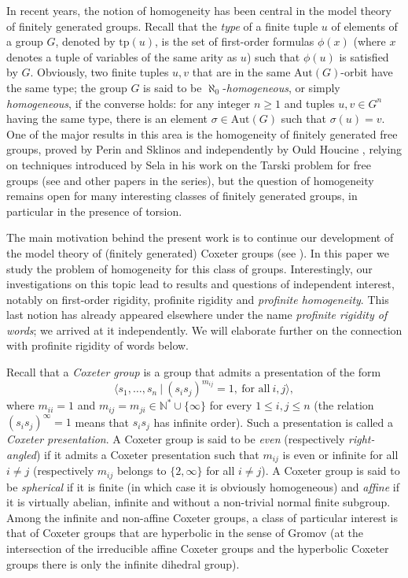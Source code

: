 \documentclass[a4paper, 11pt]{amsart}
\theoremstyle{definition}
\theoremstyle{remark}
\renewcommand{\leq}{\leqslant}
\renewcommand{\geq}{\geqslant}
\begin{document}
In recent years, the notion of homogeneity has been central in the model theory of finitely generated groups. Recall that the \emph{type} of a finite tuple $u$ of elements of a group $G$, denoted by $\mathrm{tp}(u)$, is the set of first-order formulas $\phi(x)$ (where $x$ denotes a tuple of variables of the same arity as $u$) such that $\phi(u)$ is satisfied by $G$. Obviously, two finite tuples $u,v$ that are in the same $\mathrm{Aut}(G)$-orbit have the same type; the group $G$ is said to be $\aleph_0$-\emph{homogeneous}, or simply \emph{homogeneous}, if the converse holds: for any integer $n\geq 1$ and tuples $u,v\in G^n$ having the same type, there is an element $\sigma\in \mathrm{Aut}(G)$ such that $\sigma(u)=v$. One of the major results in this area is the homogeneity of finitely generated free groups, proved by Perin and Sklinos \cite{PS12} and independently by Ould Houcine \cite{OH11}, relying on techniques introduced by Sela in his work on the Tarski problem for free groups (see \cite{Sel06} and other papers in the series), but the question of homogeneity remains open for many interesting classes of finitely generated groups, in particular in the presence of torsion.

\smallskip

The main motivation behind the present work is to continue our development of the model theory of (finitely generated) Coxeter groups (see \cite{MUHLHERR2022297,PS23,AP24}). In this paper we study the problem of homogeneity for this class of groups. Interestingly, our investigations on this topic lead to results and questions of independent interest, notably on first-order rigidity, profinite rigidity and {\em profinite homogeneity}. This last notion has already appeared elsewhere under the name {\em profinite rigidity of words}; we arrived at it independently. We will elaborate further on the connection with profinite rigidity of words below.

\smallskip

Recall that a \emph{Coxeter group} is a group that admits a presentation of the form \[\langle s_1,\ldots,s_n \ \vert \ (s_is_j)^{m_{ij}}=1, \ \text{for all} \ i,j \rangle,\] where $m_{ii}=1$ and $m_{ij} = m_{ji} \in \mathbb{N}^{\ast}\cup \lbrace \infty\rbrace$ for every $1\leq i,j\leq n$ (the relation $(s_is_j)^{\infty}=1$ means that $s_is_j$ has infinite order). Such a presentation is called a \emph{Coxeter presentation}. A Coxeter group is said to be \emph{even} (respectively \emph{right-angled}) if it admits a Coxeter presentation such that $m_{ij}$ is even or infinite for all $i\neq j$ (respectively $m_{ij}$ belongs to $\lbrace 2,\infty\rbrace$ for all $i\neq j$). A Coxeter group is said to be \emph{spherical} if it is finite (in which case it is obviously homogeneous) and \emph{affine} if it is virtually abelian, infinite and without a non-trivial normal finite subgroup. Among the infinite and non-affine Coxeter groups, a class of particular interest is that of Coxeter groups that are hyperbolic in the sense of Gromov (at the intersection of the irreducible affine Coxeter groups and the hyperbolic Coxeter groups there is only the infinite dihedral group). 
\end{document}
